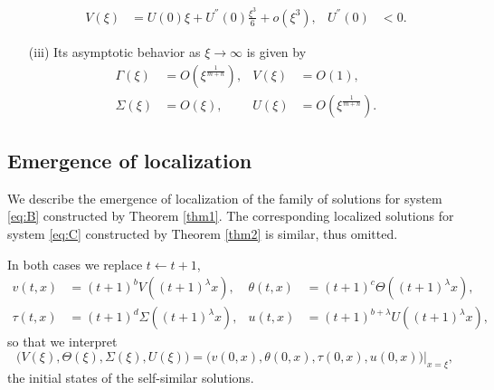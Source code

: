 \documentclass[graybox]{svmult}
\begin{document}
\begin{theorem}
\begin{enumerate}
\begin{equation}
\begin{aligned}
    V(\xi) &= U(0)\xi + U^{''}(0)\frac{\xi^3}{6} + o(\xi^3), & U^{''}(0)&<0.
  \end{aligned}
  \end{equation}
  \item[(iii)] Its asymptotic behavior as $\xi \rightarrow \infty$ is given by
  \begin{equation} \label{eq:ss_asympC1}
  \begin{aligned}
    \Gamma(\xi) &= O(\xi^{\frac{1}{m+n}}), & V(\xi) &= O(1), \\%
   \Sigma(\xi) &= O(\xi), &   U(\xi) &= O(\xi^{\frac{1}{m+n}}).
  \end{aligned}
  \end{equation}
 \end{enumerate}
\end{theorem}

\subsection{Emergence of localization}
We describe the emergence of localization of the family of solutions for system \eqref{eq:B}   constructed by Theorem \ref{thm1}. The corresponding localized solutions for system \eqref{eq:C}  constructed by Theorem \ref{thm2} is similar, thus omitted. 

In both cases we replace $t \leftarrow t+1$,
\begin{equation*}
\begin{aligned}
 v(t,x) &= (t+1)^b V((t+1)^\lambda x),  & \theta(t,x) &= (t+1)^c \Theta((t+1)^\lambda x), \\
 \tau(t,x) &= (t+1)^d \Sigma((t+1)^\lambda x), & u(t,x) &= (t+1)^{b+\lambda} U((t+1)^\lambda x),
\end{aligned}
\end{equation*}
so that we interpret 
$$\big(V(\xi),\Theta(\xi),\Sigma(\xi),U(\xi)\big)=\big(v(0,x),\theta(0,x),\tau(0,x),u(0,x)\big)|_{x=\xi},$$  the initial states of the self-similar solutions. 
\end{document}
